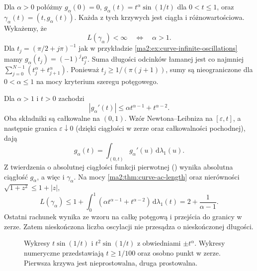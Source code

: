 \begin{przyklad}
\label{ma2:ex:curve-oscillation-threshold}
Dla $\alpha>0$ połóżmy $g_\alpha(0)=0$,
$g_\alpha(t)=t^\alpha\sin(1/t)$ dla $0<t\le1$,
oraz $\gamma_\alpha(t)=(t,g_\alpha(t))$.
Każda z tych krzywych jest ciągła
i różnowartościowa. Wykażemy, że
\[
 L(\gamma_\alpha)<\infty
 \quad\Longleftrightarrow\quad \alpha>1.
\]
Dla $t_j=(\pi/2+j\pi)^{-1}$ jak w przykładzie
\ref{ma2:ex:curve-infinite-oscillations}
mamy $g_\alpha(t_j)=(-1)^j t_j^\alpha$.
Suma długości odcinków łamanej jest co najmniej
$\sum_{j=0}^{N-1}(t_j^\alpha+t_{j+1}^\alpha)$.
Ponieważ $t_j\ge1/(\pi(j+1))$, sumy są
nieograniczone dla $0<\alpha\le1$
na mocy kryterium szeregu potęgowego.

Dla $\alpha>1$ i $t>0$ zachodzi
\[
 |g_\alpha'(t)|\le \alpha t^{\alpha-1}
                           +t^{\alpha-2}.
\]
Oba składniki są całkowalne na $(0,1)$.
Wzór Newtona--Leibniza na $[\varepsilon,t]$,
a następnie granica $\varepsilon\downarrow0$
(dzięki ciągłości w zerze oraz całkowalności
pochodnej), dają
\[
 g_\alpha(t)=\int_{(0,t)}g_\alpha'(u)\,
                          \mathrm d\lambda_1(u).
\]
Z twierdzenia o absolutnej ciągłości funkcji
pierwotnej
()
wynika absolutna ciągłość $g_\alpha$,
a więc i $\gamma_\alpha$.
Na mocy \ref{ma2:thm:curve-ac-length}
oraz nierówności $\sqrt{1+z^2}\le1+|z|$,
\[
 L(\gamma_\alpha)\le
 1+\int_0^1(\alpha t^{\alpha-1}+t^{\alpha-2})
                      \,\mathrm d\lambda_1(t)
 =2+\frac1{\alpha-1}.
\]
Ostatni rachunek wynika ze wzoru na całkę
potęgową i przejścia do granicy w zerze.
Zatem nieskończona liczba oscylacji
nie przesądza o nieskończonej długości.
\end{przyklad}

\begin{figure}[htbp]
\centering
{}
\caption{Wykresy $t\sin(1/t)$ i $t^2\sin(1/t)$
z obwiedniami $\pm t^\alpha$. Wykresy
numeryczne przedstawiają $t\ge1/100$ oraz
osobno punkt w zerze. Pierwsza krzywa jest
nieprostowalna, druga prostowalna.}
\label{ma2:fig:curve-oscillation-threshold}
\end{figure}

